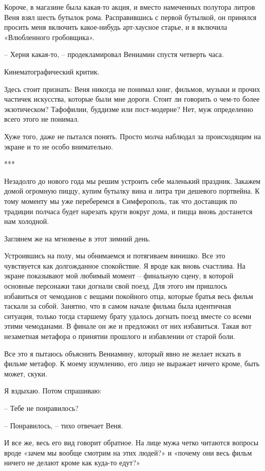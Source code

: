 \documentclass[
]{book}
\begin{document}
Короче, в магазине была какая-то акция, и вместо намеченных полутора литров Веня взял шесть бутылок рома. Расправившись с первой бутылкой, он принялся просить меня включить какое-нибудь арт-хаусное старье, и я включила «Влюбленного гробовщика».

-- Херня какая-то, -- продекламировал Вениамин спустя четверть часа.

Кинематографический критик.

Здесь стоит признать: Веня никогда не понимал книг, фильмов, музыки и прочих частичек искусства, которые были мне дороги. Стоит ли говорить о чем-то более экзотическом? Тафофилии, буддизме или пост-модерне? Нет, муж определенно всего этого не понимал.

Хуже того, даже не пытался понять. Просто молча наблюдал за происходящим на экране и то не особо внимательно.

***

Незадолго до нового года мы решим устроить себе маленький праздник. Закажем домой огромную пиццу, купим бутылку вина и литра три дешевого портвейна. К тому моменту мы уже переберемся в Симферополь, так что доставщик по традиции полчаса будет нарезать круги вокруг дома, и пицца вновь достанется нам холодной.

Заглянем же на мгновенье в этот зимний день.

Устроившись на полу, мы обнимаемся и потягиваем винишко. Все это чувствуется как долгожданное спокойствие. Я вроде как вновь счастлива. На экране показывают мой любимый момент -- финальную сцену, в которой основные персонажи таки догнали свой поезд. Для этого им пришлось избавиться от чемоданов с вещами покойного отца, которые братья весь фильм таскали за собой. Занятно, что в самом начале фильма была идентичная ситуация, только тогда старшему брату удалось догнать поезд вместе со всеми этими чемоданами. В финале он же и предложил от них избавиться. Такая вот незаметная метафора о принятии прошлого и избавлении от старой боли.

Все это я пытаюсь объяснить Вениамину, который явно не желает искать в фильме метафор. К моему изумлению, его лицо не выражает ничего кроме, быть может, скуки.

Я вздыхаю. Потом спрашиваю:

-- Тебе не понравилось?

-- Понравилось, -- тихо отвечает Веня.

И все же, весь его вид говорит обратное. На лице мужа четко читаются вопросы вроде «зачем мы вообще смотрим на этих людей?» и «почему они весь фильм ничего не делают кроме как куда-то едут?»
\end{document}
